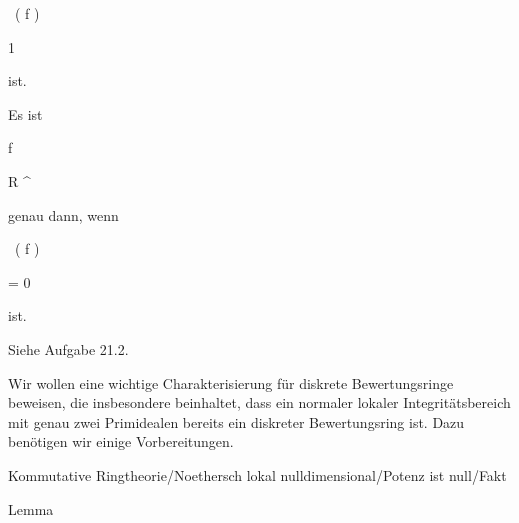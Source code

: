 {{{{\vergleichskette

{  \,  \left(   f   \right)
}

{ \geq }{ 1
}

{  }{
}

{    }{
}

{   }{
}

}
{}{}{}
ist.
}{Es ist


\mavergleichskette

{\vergleichskette

{f
}

{ \in }{ R ^{\times}
}

{  }{
}

{    }{
}

{   }{
}

}
{}{}{}
genau dann, wenn


\mavergleichskette

{\vergleichskette

{  \,  \left(   f   \right)
}

{ = }{ 0
}

{  }{
}

{    }{
}

{   }{
}

}
{}{}{}
ist.
}}

\faktzusatz {}

\faktzusatz {}


 }

{ Siehe Aufgabe 21.2. }


Wir wollen eine wichtige Charakterisierung für diskrete Bewertungsringe beweisen, die insbesondere beinhaltet, dass ein normaler lokaler Integritätsbereich mit genau zwei Primidealen bereits ein diskreter Bewertungsring ist. Dazu benötigen wir einige Vorbereitungen.



{Kommutative Ringtheorie/Noethersch lokal nulldimensional/Potenz ist null/Fakt}

{Lemma}

{}

